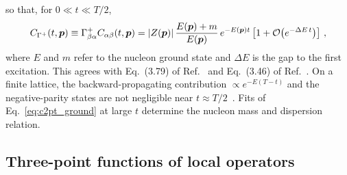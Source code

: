 so that, for $0\ll t\ll T/2$,
\begin{equation}
    C_{\Gamma^+}(t,\boldsymbol{p})\equiv\Gamma^+_{\beta\alpha}C_{\alpha\beta}(t,\boldsymbol{p})=|Z(\boldsymbol{p})|\,\frac{E(\boldsymbol{p})+m}{E(\boldsymbol{p})}\,e^{-E(\boldsymbol{p})t}\,\big[1+\mathcal O\big(e^{-\Delta E\,t}\big)\big] \ ,
    \label{eq:c2pt_ground}
\end{equation}
where $E$ and $m$ refer to the nucleon ground state and $\Delta E$ is the gap to the first excitation. This agrees with Eq.~(3.79) of Ref.~\cite{Lin:2014} and Eq.~(3.46) of Ref.~\cite{MuschThesis2}. On a finite lattice, the backward-propagating contribution $\propto e^{-E(T-t)}$ and the negative-parity states are not negligible near $t\approx T/2$~\cite{Lin:2014}. Fits of Eq.~\eqref{eq:c2pt_ground} at large $t$ determine the nucleon mass and dispersion relation.

\subsection{Three-point functions of local operators}
\label{sec:lat_3pt_local}


